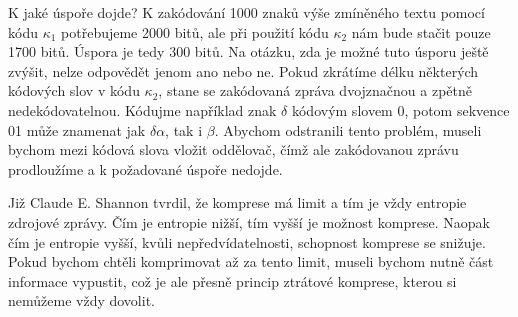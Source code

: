 K jaké úspoře dojde? K zakódování 1000 znaků výše zmíněného textu pomocí kódu $\kappa_1$ potřebujeme 2000 bitů, ale při použití kódu $\kappa_2$ nám bude stačit pouze 1700 bitů. Úspora je tedy 300 bitů. Na otázku, zda je možné tuto úsporu ještě zvýšit, nelze odpovědět jenom ano nebo ne. Pokud zkrátíme délku některých kódových slov v kódu $\kappa_2$, stane se zakódovaná zpráva dvojznačnou a zpětně nedekódovatelnou. Kódujme například znak $\delta$ kódovým slovem 0, potom sekvence 01 může znamenat jak $\delta\alpha$, tak i $\beta$. Abychom odstranili tento problém, museli bychom mezi kódová slova vložit oddělovač, čímž ale zakódovanou zprávu prodloužíme a k požadované úspoře nedojde.

Již Claude E. Shannon tvrdil, že komprese má limit a tím je vždy entropie zdrojové zprávy. Čím je entropie nižší, tím vyšší je možnost komprese. Naopak čím je entropie vyšší, kvůli nepředvídatelnosti, schopnost komprese se snižuje. Pokud bychom chtěli komprimovat až za tento limit, museli bychom nutně část informace vypustit, což je ale přesně princip ztrátové komprese, kterou si nemůžeme vždy dovolit.